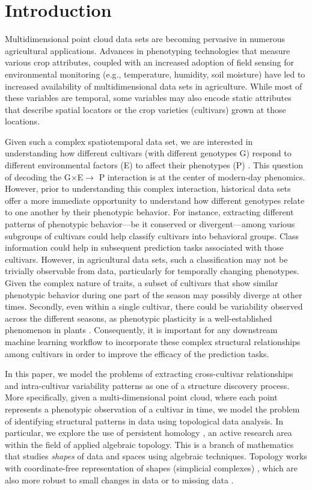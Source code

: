 
\section{Introduction}
\label{sec:intro}


Multidimensional point cloud data sets are becoming pervasive in numerous agricultural applications. Advances in phenotyping technologies that measure various crop attributes, coupled with an increased adoption of field sensing for environmental monitoring (e.g., temperature, humidity, soil moisture) have led to increased availability of multidimensional data sets in agriculture.
While most of these variables are temporal, some variables may also encode static attributes that describe spatial locators or the crop varieties (cultivars) grown at those locations.

Given such a complex spatiotemporal data set, we are interested in understanding how different cultivars (with different genotypes G) respond to different environmental factors (E) to affect their phenotypes (P) \cite{tardieu_plant_2017}. This question of decoding the G$\times$E$\rightarrow$ P interaction is at the center of modern-day phenomics.
However, prior to understanding this complex interaction, historical data sets offer a more immediate opportunity to understand how different genotypes relate to one another by their phenotypic behavior. For instance, extracting different patterns of phenotypic behavior---be it conserved or divergent---among various subgroups of cultivars could help classify cultivars into  behavioral groups. Class information could help in subsequent prediction tasks associated with those cultivars. However, in agricultural data sets, such a classification may not be trivially observable from data, particularly for temporally changing phenotypes.  Given the complex nature of traits, a subset of cultivars that show similar phenotypic behavior during one part of the season may possibly diverge at other times.  Secondly, even within a single cultivar, there could be  variability observed across the different seasons, as phenotypic plasticity is a well-established phenomenon in plants \cite{schlichting1986evolution}.
Consequently, it is important for any downstream machine learning workflow to incorporate these complex structural relationships among cultivars in order to improve the efficacy of the prediction tasks. 

In this paper, we model the problems of extracting cross-cultivar  relationships and intra-cultivar variability patterns as one of a structure discovery process. More specifically, given a multi-dimensional point cloud, where each point represents a phenotypic observation of a cultivar in time, we model the problem of identifying structural patterns in data using topological data analysis. In particular, we explore the use of persistent homology \cite{edelsbrunner_persistent_2013}, an active research area within the field of applied algebraic  topology. This is a branch of mathematics that studies \emph{shapes} of data and spaces using algebraic techniques. Topology works with coordinate-free representation of shapes (simplicial complexes) \cite{munkres2018elements},
which are also more robust to small changes in data or to missing data \cite{lum_extracting_2013}.

